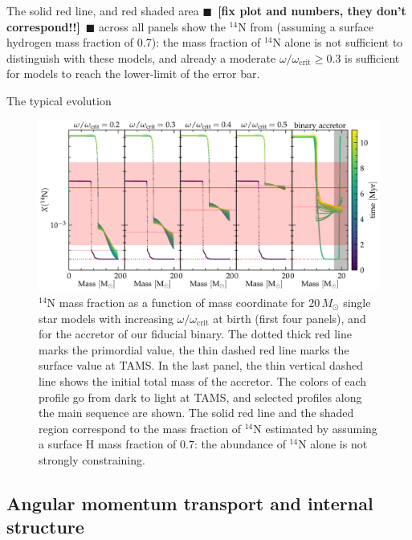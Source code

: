 \documentclass[twocolumn,twocolappendix,trackchanges]{aastex63}
\newcommand{\todo}[1]{{\large $\blacksquare$~\textbf{\color{red}[#1]}}~$\blacksquare$}
\begin{document}
The solid red line, and red shaded area \todo{fix plot and numbers,
  they don't correspond!!} across all panels show the
$^{14}\mathrm{N}$ from \cite{villamariz:05} (assuming a surface
hydrogen mass fraction of 0.7): the mass fraction of $^{14}\mathrm{N}$
alone is not sufficient to distinguish with these models, and already
a moderate $\omega/\omega_\mathrm{crit}\geq0.3$ is sufficient for
models to reach the lower-limit of the error bar.

The typical evolution


\begin{figure}[htbp]
  \centering
  \includegraphics[width=\textwidth]{n14_struct_complete_zeta_ab}
  \caption{$^{14}\mathrm{N}$ mass fraction as a function of mass
    coordinate for $20\,M_\odot$ single star models with increasing
    $\omega/\omega_\mathrm{crit}$ at birth (first four panels), and
    for the accretor of our fiducial binary. The dotted thick red line
    marks the primordial value, the thin dashed red line marks the
    surface value at TAMS. In the last panel, the thin vertical dashed line shows the initial total mass of the accretor. The colors of each profile go from dark to
    light at TAMS, and selected profiles along the main sequence are
    shown. The solid red line and the shaded region correspond to the
    mass fraction of $^{14}\mathrm{N}$ estimated by
    \cite{villamariz:05} assuming a surface H mass fraction of 0.7:
    the abundance of $^{14}\mathrm{N}$ alone is not strongly constraining.}
  \label{fig:n14}
\end{figure}



\subsection{Angular momentum transport and internal structure}
\label{sec:rot}
\end{document}
